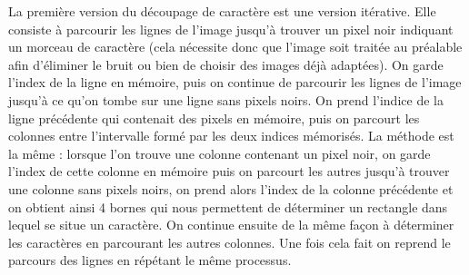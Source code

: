 \documentclass[12pt]{report}
\begin{document}
La première version du découpage de caractère est une version itérative. Elle consiste à parcourir les lignes de l'image jusqu'à trouver un pixel noir indiquant un morceau de caractère (cela nécessite donc que l'image soit traitée au préalable afin d'éliminer le bruit ou bien de choisir des images déjà adaptées). On garde l'index de la ligne en mémoire, puis on continue de parcourir les lignes de l'image jusqu'à ce qu'on tombe sur une ligne sans pixels noirs. On prend l'indice de la ligne précédente qui contenait des pixels en mémoire, puis on parcourt les colonnes entre l'intervalle formé par les deux indices mémorisés. La méthode est la même : lorsque l'on trouve une colonne contenant un pixel noir, on garde l'index de cette colonne en mémoire puis on parcourt les autres jusqu'à trouver une colonne sans pixels noirs, on prend alors l'index de la colonne précédente et on obtient ainsi 4 bornes qui nous permettent de déterminer un rectangle dans lequel se situe un caractère. On continue ensuite de la même façon à déterminer les caractères en parcourant les autres colonnes. Une fois cela fait on reprend le parcours des lignes en répétant le même processus.
\end{document}
